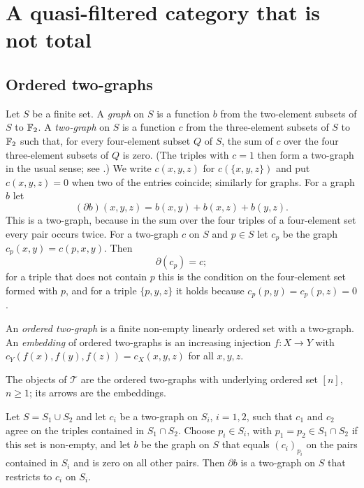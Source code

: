\section{A quasi-filtered category that is not total}\label{sec:twographs}

\subsection{Ordered two-graphs}

Let $S$ be a finite set. A \emph{graph} on $S$ is a function $b$ from the
two-element subsets of $S$ to $\mathbb{F}_2$. A \emph{two-graph} on $S$ is a function
$c$ from the three-element subsets of $S$ to $\mathbb{F}_2$ such that, for every
four-element subset $Q$ of $S$, the sum of $c$ over the four three-element
subsets of $Q$ is zero. (The triples with $c=1$ then form a two-graph in the
usual sense; see \cite{Seidel}.) We write $c(x,y,z)$ for $c(\{x,y,z\})$ and
put $c(x,y,z)=0$ when two of the entries coincide; similarly for graphs. For
a graph $b$ let
\[
 (\partial b)(x,y,z)=b(x,y)+b(x,z)+b(y,z).
\]
This is a two-graph, because in the sum over the four triples of a
four-element set every pair occurs twice. For a two-graph $c$ on $S$ and
$p\in S$ let $c_p$ be the graph $c_p(x,y)=c(p,x,y)$. Then
\begin{equation}\label{eq:anchor}
 \partial(c_p)=c ;
\end{equation}
for a triple that does not contain $p$ this is the condition on the
four-element set formed with $p$, and for a triple $\{p,y,z\}$ it holds because
$c_p(p,y)=c_p(p,z)=0$.

An \emph{ordered two-graph} is a finite non-empty linearly ordered set with a
two-graph. An \emph{embedding} of ordered two-graphs is an increasing
injection $f\colon X\to Y$ with $c_Y(f(x),f(y),f(z))=c_X(x,y,z)$ for all
$x,y,z$.

\begin{definition}
The objects of $\mathcal T$ are the ordered two-graphs with underlying ordered
set $[n]$, $n\ge1$; its arrows are the embeddings.
\end{definition}

\begin{lemma}\label{lem:anchored}
Let $S=S_1\cup S_2$ and let $c_i$ be a two-graph on $S_i$, $i=1,2$, such that
$c_1$ and $c_2$ agree on the triples contained in $S_1\cap S_2$. Choose
$p_i\in S_i$, with $p_1=p_2\in S_1\cap S_2$ if this set is non-empty, and let
$b$ be the graph on $S$ that equals $(c_i)_{p_i}$ on the pairs contained in
$S_i$ and is zero on all other pairs. Then $\partial b$ is a two-graph on $S$
that restricts to $c_i$ on $S_i$.
\end{lemma}

